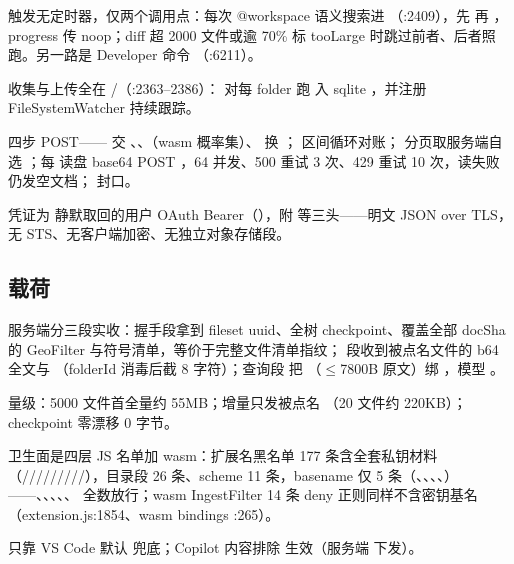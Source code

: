 触发无定时器，仅两个调用点：每次 @workspace 语义搜索进 （:2409），先  再 ，progress 传 noop；diff 超 2000 文件或逾 70\% 标 tooLarge 时跳过前者、后者照跑。另一路是 Developer 命令 （:6211）。

收集与上传全在 /（:2363--2386）： 对每 folder 跑  入 sqlite ，并注册 FileSystemWatcher 持续跟踪。

 四步 POST—— 交 、、（wasm 概率集）、 换 ； 区间循环对账； 分页取服务端自选 ；每  读盘 base64 POST ，64 并发、500 重试 3 次、429 重试 10 次，读失败仍发空文档； 封口。

凭证为  静默取回的用户 OAuth Bearer（），附  等三头——明文 JSON over TLS，无 STS、无客户端加密、无独立对象存储段。

\subsection{载荷}

服务端分三段实收：握手段拿到 fileset uuid、全树 checkpoint、覆盖全部 docSha 的 GeoFilter 与符号清单，等价于完整文件清单指纹； 段收到被点名文件的 b64 全文与 （folderId 消毒后截 8 字符）；查询段  把 （$\le$7800B 原文）绑 ，模型 。

量级：5000 文件首全量约 55MB；增量只发被点名 （20 文件约 220KB）；checkpoint 零漂移 0 字节。

卫生面是四层 JS 名单加 wasm：扩展名黑名单 177 条含全套私钥材料（/////////），目录段 26 条、scheme 11 条，basename 仅 5 条（、、、、）——、、、、、 全数放行；wasm IngestFilter 14 条 deny 正则同样不含密钥基名（extension.js:1854、wasm bindings :265）。

 只靠 VS Code 默认  兜底；Copilot 内容排除  生效（服务端  下发）。

